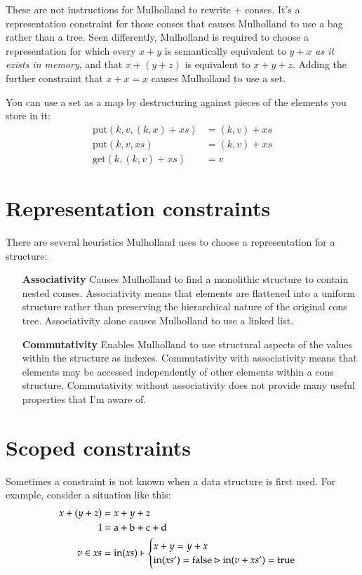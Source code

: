 \documentclass{report}
\begin{document}
  These are not instructions for Mulholland to rewrite $+$ conses. It's a representation constraint for those conses that causes Mulholland to use a bag rather than a tree. Seen differently,
  Mulholland is required to choose a representation for which every $x + y$ is semantically equivalent to $y + x$ {\em as it exists in memory}, and that $x + (y + z)$ is equivalent to $x + y +
  z$. Adding the further constraint that $x + x = x$ causes Mulholland to use a set.

  You can use a set as a map by destructuring against pieces of the elements you store in it:
\begin{align*}
\textrm{put}(k, v, (k, x) + xs) & = (k, v) + xs \\
\textrm{put}(k, v, xs)          & = (k, v) + xs \\
\textrm{get}(k, (k, v) + xs)    & = v
\end{align*}

\section{Representation constraints}
    There are several heuristics Mulholland uses to choose a representation for a structure:

\begin{enumerate}
\item[\bf Associativity]
  Causes Mulholland to find a monolithic structure to contain nested conses. Associativity means that elements are flattened into a uniform structure rather than preserving the
  hierarchical nature of the original cons tree. Associativity alone causes Mulholland to use a linked list.

\item[\bf Commutativity]
  Enables Mulholland to use structural aspects of the values within the structure as indexes. Commutativity with associativity means that elements may be accessed independently of other
  elements within a cons structure. Commutativity without associativity does not provide many useful properties that I'm aware of.
\end{enumerate}

\section{Scoped constraints}
    Sometimes a constraint is not known when a data structure is first used. For example, consider a situation like this:
\begin{align*}
x + (y + z) & = x + y + z \\
\textrm l   & = \textrm a + \textrm b + \textrm c + \textrm d \\
v \in xs    & = \textrm{in}(xs) \vdash \begin{cases}
                                         x + y = y + x \\
                                         \textrm{in}(xs') = \textrm{false} \rhd \textrm{in}(v + xs') = \textrm{true}
                                       \end{cases}
\end{align*}
\end{document}
